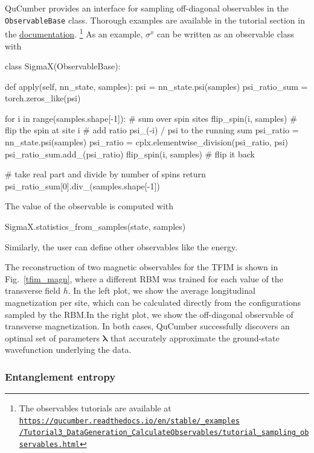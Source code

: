 \documentclass[submission, Phys, hidelnks]{SciPost}
\begin{document}
QuCumber provides an interface for sampling off-diagonal observables in the
\verb|ObservableBase| class. Thorough examples are available in the tutorial
section in the \href{https://qucumber.readthedocs.io/en/stable/}{documentation}.\!\!
\footnote{The observables tutorials are available at
    \href{https://qucumber.readthedocs.io/en/stable/\_examples/Tutorial3\_DataGeneration\_CalculateObservables/tutorial\_sampling\_observables.html
}{\texttt{https://qucumber.readthedocs.io/en/stable/\_examples\\/Tutorial3\_DataGeneration\_CalculateObservables/tutorial\_sampling\_observables.html}}
}
As an example, $\sigma^x$ can be written as an observable class with
\begin{python}
class SigmaX(ObservableBase):

    def apply(self, nn_state, samples):
        psi = nn_state.psi(samples)
        psi_ratio_sum = torch.zeros_like(psi)

        for i in range(samples.shape[-1]):  # sum over spin sites
            flip_spin(i, samples)  # flip the spin at site i
            # add ratio psi_(-i) / psi to the running sum
            psi_ratio = nn_state.psi(samples)
            psi_ratio = cplx.elementwise_division(psi_ratio, psi)
            psi_ratio_sum.add_(psi_ratio)
            flip_spin(i, samples)  # flip it back

        # take real part and divide by number of spins
        return psi_ratio_sum[0].div_(samples.shape[-1])
\end{python}
The value of the observable is computed with
\begin{python}
SigmaX.statistics_from_samples(state, samples)
\end{python}
Similarly, the user can define other observables like the energy.

The reconstruction of two magnetic observables for the TFIM is shown in
Fig.~\ref{tfim_magn}, where a different RBM was trained for each value of
the transverse field $h$. In the left plot, we show the average longitudinal
magnetization per site, which can be calculated directly from the
configurations sampled by the RBM.\@ In the right plot, we show the off-diagonal
observable of transverse magnetization. In both cases, QuCumber successfully
discovers an optimal set of parameters $\bm{\lambda}$ that accurately
approximate the ground-state wavefunction underlying the data.


\subsubsection{Entanglement entropy}\label{sec:swap}
\end{document}

